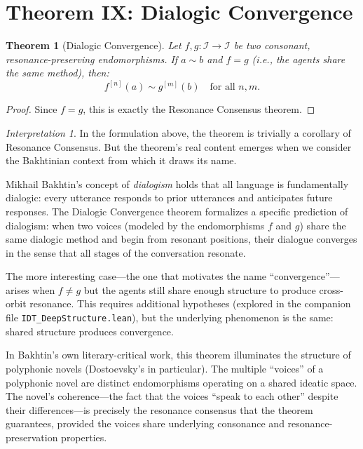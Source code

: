 \documentclass[11pt,openany]{book}
\theoremstyle{definition}
\theoremstyle{plain}
\newtheorem{theorem}[axiom]{Theorem}
\theoremstyle{remark}
\newtheorem{interpretation}[axiom]{Interpretation}
\newcommand{\IS}{\mathcal{I}}               %
\newcommand{\res}{\sim}                      %
\begin{document}
\section{Theorem IX: Dialogic Convergence}

\begin{theorem}[Dialogic Convergence]
\label{thm:key-dialogic}
Let $f, g : \IS \to \IS$ be two consonant, resonance-preserving endomorphisms. If $a \res b$ and $f = g$ (i.e., the agents share the same method), then:
\[
f^{[n]}(a) \res g^{[m]}(b) \quad \text{for all } n, m.
\]
\end{theorem}

\begin{proof}
Since $f = g$, this is exactly the Resonance Consensus theorem.
\end{proof}

\begin{interpretation}
In the formulation above, the theorem is trivially a corollary of Resonance Consensus. But the theorem's real content emerges when we consider the Bakhtinian context from which it draws its name.

Mikhail Bakhtin's concept of \emph{dialogism} holds that all language is fundamentally dialogic: every utterance responds to prior utterances and anticipates future responses. The Dialogic Convergence theorem formalizes a specific prediction of dialogism: when two voices (modeled by the endomorphisms $f$ and $g$) share the same dialogic method and begin from resonant positions, their dialogue converges in the sense that all stages of the conversation resonate.

The more interesting case---the one that motivates the name ``convergence''---arises when $f \neq g$ but the agents still share enough structure to produce cross-orbit resonance. This requires additional hypotheses (explored in the companion file \texttt{IDT\_DeepStructure.lean}), but the underlying phenomenon is the same: shared structure produces convergence.

In Bakhtin's own literary-critical work, this theorem illuminates the structure of polyphonic novels (Dostoevsky's in particular). The multiple ``voices'' of a polyphonic novel are distinct endomorphisms operating on a shared ideatic space. The novel's coherence---the fact that the voices ``speak to each other'' despite their differences---is precisely the resonance consensus that the theorem guarantees, provided the voices share underlying consonance and resonance-preservation properties.
\end{interpretation}
\end{document}
